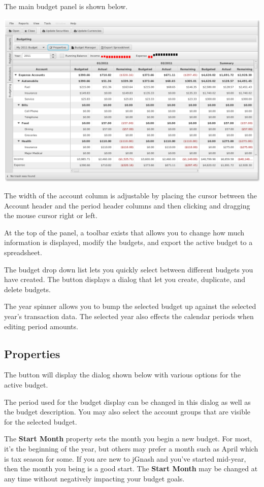 \documentclass[letterpaper,12pt]{book}
\begin{document}
    The main budget panel is shown below.

    \includegraphics[width=1.0\linewidth]{images/budget-overview}

    The width of the account column is adjustable by placing the cursor between the Account header and the period header
    columns and then clicking and dragging the mouse cursor right or left.

    At the top of the panel, a toolbar exists that allows you to change how much information is displayed, modify the
    budgets, and export the active budget to a spreadsheet.

    The budget drop down list lets you quickly select between different budgets you have created.
    The  button displays a dialog that let you create, duplicate, and delete budgets.

    The year spinner allows you to bump the selected budget up against the selected year's transaction data.
    The selected year also effects the calendar periods when editing period amounts.

    \subsection{Properties}\label{subsec:properties}
    The  button will display the dialog shown below with various options for the active budget.

    The period used for the budget display can be changed in this dialog as well as the budget description.
    You may also select the account groups that are visible for the selected budget.

    The \textbf{Start Month} property sets the month you begin a new budget. For most, it's the beginning of the year, but
    others may prefer a month such as April which is tax season for some. If you are new to jGnash and you've started
    mid-year, then the month you being is a good start. The \textbf{Start Month} may be changed at any time without negatively
    impacting your budget goals.
\end{document}
